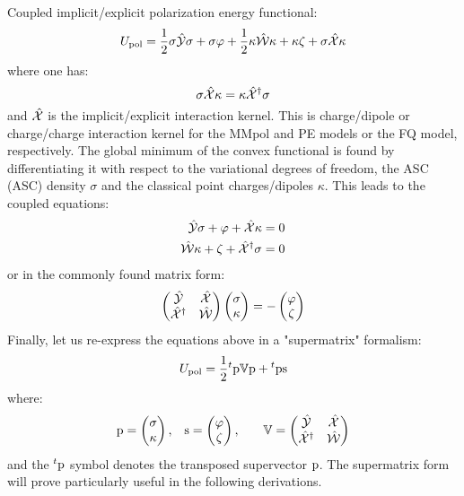 Coupled implicit/explicit polarization energy
functional:~\autocite{Lipparini}
\begin{equation}\label{eq:pcm-mm-functional}
  U_\mathrm{pol} =
   \frac{1}{2}\sigma\hat{\mathcal{Y}}\sigma + \sigma\varphi
 + \frac{1}{2}\kappa\hat{\mathcal{W}}\kappa + \kappa\zeta
 + \sigma\hat{\mathcal{X}}\kappa
\end{equation}
where one has:
\begin{equation}
  \sigma\hat{\mathcal{X}}\kappa = \kappa\hat{\mathcal{X}}^\dagger\sigma
\end{equation}
and $\hat{\mathcal{X}}$ is the implicit/explicit interaction kernel. This is
charge/dipole or charge/charge interaction kernel for the MMpol and
\ac{PE} models
or the \ac{FQ} model, respectively.
The global minimum of the convex functional is found by differentiating
it with respect to the variational degrees of freedom, \ie{} the
\acl{ASC} (\acs{ASC}) density $\sigma$ and the classical point
charges/dipoles $\kappa$. This leads to the coupled equations:
\begin{align}
  \hat{\mathcal{Y}}\sigma + \varphi + \hat{\mathcal{X}}\kappa &= 0 \\
  \hat{\mathcal{W}}\kappa  + \zeta + \hat{\mathcal{X}}^\dagger\sigma &= 0
\end{align}
or in the commonly found matrix form:
\begin{equation}
  \begin{pmatrix}
    \hat{\mathcal{Y}} & \hat{\mathcal{X}} \\
    \hat{\mathcal{X}}^\dagger & \hat{\mathcal{W}}
  \end{pmatrix}
  \begin{pmatrix}
   \sigma \\
   \kappa
  \end{pmatrix}
  =
  -
  \begin{pmatrix}
   \varphi \\
   \zeta
  \end{pmatrix}
\end{equation}
Finally, let us re-express the equations above in a "supermatrix"
formalism:
\begin{equation}
  U_\mathrm{pol} =
  \frac{1}{2}{}^t\mathrm{p}\mathbb{V}\mathrm{p} + {}^t\mathrm{p}\mathrm{s}
\end{equation}
where:
\begin{alignat}{3}
  \mathrm{p} =
  \begin{pmatrix}
    \sigma \\
    \kappa
  \end{pmatrix},
  \quad&
  \mathrm{s} =
  \begin{pmatrix}
   \varphi \\
   \zeta
  \end{pmatrix},
  \quad&
  \mathbb{V} =
  \begin{pmatrix}
    \hat{\mathcal{Y}} & \hat{\mathcal{X}} \\
    \hat{\mathcal{X}}^\dagger & \hat{\mathcal{W}}
  \end{pmatrix}
\end{alignat}
and the ${}^t\mathrm{p}$ symbol denotes the transposed supervector $\mathrm{p}$.
The supermatrix form will prove particularly useful in the following
derivations.

